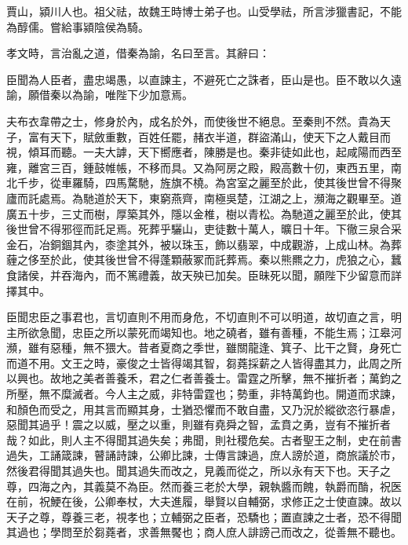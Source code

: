 
\begin{pinyinscope}
賈山，潁川人也。祖父祛，故魏王時博士弟子也。山受學祛，所言涉獵書記，不能為醇儒。嘗給事潁陰侯為騎。

孝文時，言治亂之道，借秦為諭，名曰至言。其辭曰：

臣聞為人臣者，盡忠竭愚，以直諫主，不避死亡之誅者，臣山是也。臣不敢以久遠諭，願借秦以為諭，唯陛下少加意焉。

夫布衣韋帶之士，修身於內，成名於外，而使後世不絕息。至秦則不然。貴為天子，富有天下，賦斂重數，百姓任罷，赭衣半道，群盜滿山，使天下之人戴目而視，傾耳而聽。一夫大謼，天下嚮應者，陳勝是也。秦非徒如此也，起咸陽而西至雍，離宮三百，鍾鼓帷帳，不移而具。又為阿房之殿，殿高數十仞，東西五里，南北千步，從車羅騎，四馬騖馳，旌旗不橈。為宮室之麗至於此，使其後世曾不得聚廬而託處焉。為馳道於天下，東窮燕齊，南極吳楚，江湖之上，瀕海之觀畢至。道廣五十步，三丈而樹，厚築其外，隱以金椎，樹以青松。為馳道之麗至於此，使其後世曾不得邪徑而託足焉。死葬乎驪山，吏徒數十萬人，曠日十年。下徹三泉合采金石，冶銅錮其內，桼塗其外，被以珠玉，飾以翡翠，中成觀游，上成山林。為葬薶之侈至於此，使其後世曾不得蓬顆蔽冢而託葬焉。秦以熊羆之力，虎狼之心，蠶食諸侯，并吞海內，而不篤禮義，故天殃已加矣。臣昧死以聞，願陛下少留意而詳擇其中。

臣聞忠臣之事君也，言切直則不用而身危，不切直則不可以明道，故切直之言，明主所欲急聞，忠臣之所以蒙死而竭知也。地之磽者，雖有善種，不能生焉；江皋河瀕，雖有惡種，無不猥大。昔者夏商之季世，雖關龍逢、箕子、比干之賢，身死亡而道不用。文王之時，豪俊之士皆得竭其智，芻蕘採薪之人皆得盡其力，此周之所以興也。故地之美者善養禾，君之仁者善養士。雷霆之所擊，無不摧折者；萬鈞之所壓，無不糜滅者。今人主之威，非特雷霆也；勢重，非特萬鈞也。開道而求諫，和顏色而受之，用其言而顯其身，士猶恐懼而不敢自盡，又乃況於縱欲恣行暴虐，惡聞其過乎！震之以威，壓之以重，則雖有堯舜之智，孟賁之勇，豈有不摧折者哉？如此，則人主不得聞其過失矣；弗聞，則社稷危矣。古者聖王之制，史在前書過失，工誦箴諫，瞽誦詩諫，公卿比諫，士傳言諫過，庶人謗於道，商旅議於市，然後君得聞其過失也。聞其過失而改之，見義而從之，所以永有天下也。天子之尊，四海之內，其義莫不為臣。然而養三老於大學，親執醬而餽，執爵而酳，祝医在前，祝鯁在後，公卿奉杖，大夫進履，舉賢以自輔弼，求修正之士使直諫。故以天子之尊，尊養三老，視孝也；立輔弼之臣者，恐驕也；置直諫之士者，恐不得聞其過也；學問至於芻蕘者，求善無饜也；商人庶人誹謗己而改之，從善無不聽也。


\end{pinyinscope}
